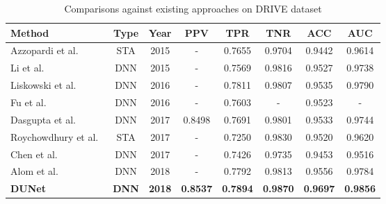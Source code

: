 \documentclass[journal]{IEEEtran}
\begin{document}
\begin{table}[]
\caption{Comparisons against existing approaches on DRIVE dataset}
\renewcommand\arraystretch{1.3}      
\renewcommand\tabcolsep{1.0pt} 
\begin{center}
\begin{tabular}{lccccccc}
\toprule
 Method & Type  & Year   & PPV   & TPR      & TNR   & ACC   & AUC        \\ \hline
 Azzopardi et al.~\cite{azzopardi_trainable_2015}  & STA   & 2015    & -   & 0.7655   & 0.9704 & 0.9442   & 0.9614          \\ 
Li et al.~\cite{Li2015A} & DNN   & 2015    & -   & 0.7569   & 0.9816 & 0.9527   & 0.9738            \\
 Liskowski et al.~\cite{liskowski_segmenting_2016} & DNN   & 2016    & -   & 0.7811   & 0.9807 & 0.9535   & 0.9790            \\ 
 Fu et al.~\cite{fu_deepvessel:_2016}        & DNN        & 2016     & -   & 0.7603   & -      & 0.9523   & -               \\ 
 Dasgupta et al.~\cite{dasgupta_fully_2017}     & DNN     & 2017    & 0.8498 & 0.7691 & 0.9801 & 0.9533   & 0.9744     \\ 
 Roychowdhury et al.~\cite{Roychowdhury2017Blood} & STA & 2017    & -    & 0.7250   & 0.9830 & 0.9520   & 0.9620          \\ 
 Chen et al.~\cite{chen2017a}        & DNN        & 2017  & -    & 0.7426   & 0.9735 & 0.9453   & 0.9516          \\ 
 Alom et al.~\cite{alom_recurrent_2018}        & DNN        & 2018  & -    & 0.7792   & 0.9813 & 0.9556   & 0.9784          \\ 
 \textbf{DUNet}  & \textbf{DNN} & \textbf{2018} & \textbf{0.8537} & \textbf{0.7894} & \textbf{0.9870} & \textbf{0.9697} & \textbf{0.9856} \\ 
\bottomrule
\end{tabular}
\end{center}
\label{table:DRIVE_comparisons}
\end{table}
\end{document}
